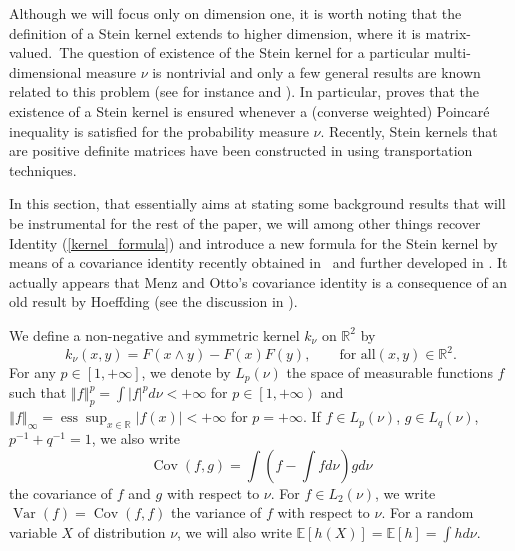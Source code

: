 \documentclass[11pt]{article}
\DeclareMathOperator{\var}{Var}
\DeclareMathOperator{\cov}{Cov}
\DeclareMathOperator{\ess}{ess}
\begin{document}
Although we will focus only on dimension one, it is worth noting that the
definition of a Stein kernel extends to higher dimension, where it is
matrix-valued.\ The question of existence of the Stein kernel for a
particular multi-dimensional measure $\nu $ is nontrivial and only a few
general results are known related to this problem (see for instance \cite%
{LedoucNourdinPeccati:15} \cite{courtade2017existence} and \cite%
{fathi2018stein}). In particular, \cite{courtade2017existence} proves that
the existence of a Stein kernel is ensured whenever a (converse weighted)
Poincar\'{e} inequality is satisfied for the probability measure $\nu $.
Recently, Stein kernels that are positive definite matrices have been
constructed in \cite{fathi2018stein} using transportation techniques.

In this section, that essentially aims at stating some background results
that will be instrumental for the rest of the paper, we will among other
things recover Identity (\ref{kernel_formula}) and introduce a new formula
for the Stein kernel by means of a covariance identity recently obtained in 
\cite{Menz-Otto:2013}\ and further developed in \cite{saumwellner2017efron}.
It actually appears that Menz and Otto's covariance identity is a
consequence of an old result by Hoeffding (see the discussion in \cite%
{Saumard-Wellner:17}).

We define a non-negative and symmetric kernel $k_{\nu }$ on $\mathbb{R}^{2}$
by 
\begin{equation}
k_{\nu }\left( x,y\right) =F\left( x\wedge y\right) -F\left( x\right)
F\left( y\right) ,\qquad \mbox{for all}\left( x,y\right) \in \mathbb{R}^{2}.
\label{def_kernel}
\end{equation}%
For any $p\in \left[ 1,+\infty \right] $, we denote by $L_{p}\left( \nu
\right) $ the space of measurable functions $f$ such that $\left\Vert
f\right\Vert _{p}^{p}=\int \left\vert f\right\vert ^{p}d\nu <+\infty $ for $%
p\in \left[ 1,+\infty \right) $ and $\left\Vert f\right\Vert _{\infty }=%
\ess%
\sup_{x\in \mathbb{R}}\left\vert f\left( x\right) \right\vert <+\infty $ for 
$p=+\infty $. If $f\in L_{p}\left( \nu \right) $, $g\in L_{q}\left( \nu
\right) $, $p^{-1}+q^{-1}=1$, we also write%
\begin{equation*}
\cov%
\left( f,g\right) =\int \left( f-\int fd\nu \right) gd\nu 
\end{equation*}%
the covariance of $f$ and $g$ with respect to $\nu $. For $f\in L_{2}\left(
\nu \right) $, we write $%
\var%
\left( f\right) =%
\cov%
\left( f,f\right) $ the variance of $f$ with respect to $\nu $. For a random
variable $X$ of distribution $\nu $, we will also write $\mathbb{E}\left[
h\left( X\right) \right] =\mathbb{E}\left[ h\right] =\int hd\nu $.
\end{document}
